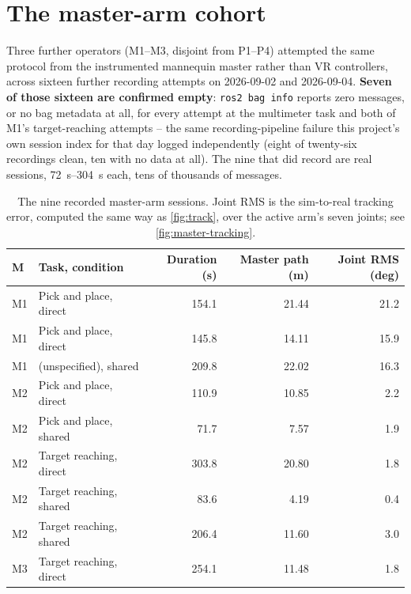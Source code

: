 \section{The master-arm cohort}

Three further operators (M1--M3, disjoint from P1--P4) attempted the same
protocol from the instrumented mannequin master rather than VR controllers,
across sixteen further recording attempts on 2026-09-02 and 2026-09-04.
\textbf{Seven of those sixteen are confirmed empty}: \texttt{ros2 bag info}
reports zero messages, or no bag metadata at all, for every attempt at the
multimeter task and both of M1's target-reaching attempts -- the same
recording-pipeline failure this project's own session index for that day
logged independently (eight of twenty-six recordings clean, ten with no data
at all). The nine that did record are real sessions,
\SIrange{72}{304}{\second} each, tens of thousands of messages.

\begin{table}[htbp]
  \centering
  \small
  \caption[Master-arm sessions]{The nine recorded master-arm sessions.
  Joint RMS is the sim-to-real tracking error, computed the same way as
  \cref{fig:track}, over the active arm's seven joints; see
  \cref{fig:master-tracking}.}
  \label{tab:master-sessions}
  \begin{tabular}{@{}llrrr@{}}
    \toprule
    M & Task, condition & Duration (s) & Master path (m) & Joint RMS (deg) \\
    \midrule
    M1 & Pick and place, direct   & 154.1 & 21.44 & 21.2 \\
    M1 & Pick and place, direct   & 145.8 & 14.11 & 15.9 \\
    M1 & (unspecified), shared     & 209.8 & 22.02 & 16.3 \\
    M2 & Pick and place, direct   & 110.9 & 10.85 & 2.2 \\
    M2 & Pick and place, shared   & 71.7  & 7.57  & 1.9 \\
    M2 & Target reaching, direct   & 303.8 & 20.80 & 1.8 \\
    M2 & Target reaching, shared   & 83.6  & 4.19  & 0.4 \\
    M2 & Target reaching, shared   & 206.4 & 11.60 & 3.0 \\
    M3 & Target reaching, direct   & 254.1 & 11.48 & 1.8 \\
    \bottomrule
  \end{tabular}
\end{table}

